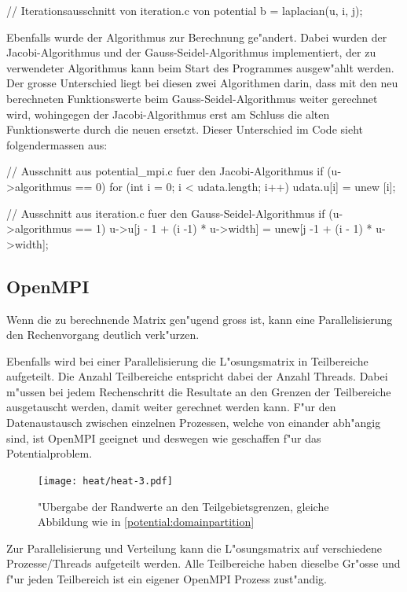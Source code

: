 \begin{refsection}
	\begin{code}
	// Iterationsausschnitt von iteration.c von potential
		b = laplacian(u, i, j);	\end{code}	
Ebenfalls wurde der Algorithmus zur Berechnung ge"andert. Dabei wurden
der Jacobi-Algorithmus und der Gauss-Seidel-Algorithmus implementiert,
der zu verwendeter Algorithmus kann beim Start des Programmes ausgew"ahlt
werden. Der grosse Unterschied liegt bei diesen zwei Algorithmen darin,
dass mit den neu berechneten Funktionswerte beim Gauss-Seidel-Algorithmus
weiter gerechnet wird, wohingegen der Jacobi-Algorithmus erst am Schluss
die alten Funktionswerte durch die neuen ersetzt. Dieser Unterschied im
Code sieht folgendermassen aus:
			
	\begin{code}
	// Ausschnitt aus potential_mpi.c fuer den Jacobi-Algorithmus
	if (u->algorithmus == 0)  {
		for (int i = 0; i < udata.length; i++)	{
			udata.u[i] = unew [i];
		}
	}\end{code}
					
	\begin{code}
	// Ausschnitt aus iteration.c fuer den Gauss-Seidel-Algorithmus
	if (u->algorithmus == 1)  {
		u->u[j - 1 + (i -1) * u->width] = unew[j -1 + (i - 1) * u->width];
	}\end{code}	
			
		
\subsection{OpenMPI}	
Wenn die zu berechnende Matrix gen"ugend gross ist, kann eine
Parallelisierung den Rechenvorgang deutlich verk"urzen.

Ebenfalls wird bei einer Parallelisierung die L"osungsmatrix in
Teilbereiche aufgeteilt. Die Anzahl Teilbereiche entspricht dabei der
Anzahl Threads. Dabei m"ussen bei jedem Rechenschritt die Resultate an
den Grenzen der Teilbereiche ausgetauscht werden, damit weiter gerechnet
werden kann. F"ur den Datenaustausch zwischen einzelnen Prozessen,
welche von einander abh"angig sind, ist OpenMPI geeignet und deswegen
wie geschaffen f"ur das Potentialproblem.
				 
	 
\begin{figure}[h] 
\centering 
\texttt{[image: heat/heat-3.pdf]}
\caption{"Ubergabe der Randwerte an den Teilgebietsgrenzen, gleiche Abbildung wie in \ref{potential:domainpartition}}
\end{figure}

Zur Parallelisierung und Verteilung kann die L"osungsmatrix
auf verschiedene Prozesse/Threads aufgeteilt werden. Alle Teilbereiche
haben dieselbe Gr"osse und f"ur jeden Teilbereich ist ein eigener OpenMPI
Prozess zust"andig. 
		

\end{refsection}
